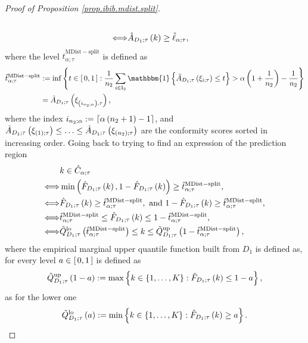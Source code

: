 \documentclass[11pt]{article}
\begin{document}
\begin{proof}[Proof of Proposition \ref{prop.ibib.mdist.split}]
\begin{align*}
    \\
    \Longleftrightarrow
    &
    \hat{A}_{D_1; \tau} \left( k \right)
    \geq \hat{\ell}_{\alpha; \tau},
\end{align*}
where the level $\hat{t}_{\alpha; \tau}^{\mathrm{MDist-split}}$ is defined as
\begin{align}
\label{eq.emp.conf.level}
    \hat{t}_{\alpha; \tau}^{\mathrm{MDist-split}}
    &
    := \inf
    \brac{
        t \in \croch{0, 1} :
        \frac{
            1
        }{n_2}
        \sum_{i \in \mathrm{I_2}}
        \mathbbm{1}
        \brac{
            \hat{A}_{D_1; \tau} \paren{\xi_{i; \tau}}
            \leq t
        } > \alpha \paren{1 + \frac{1}{n_2}} - \frac{1}{n_2}
    }
    \notag
    \\
    &
    =
    \hat{A}_{D_1; \tau} \paren{\xi_{\paren{i_{n_2; \alpha}}, \tau}},
\end{align}
where the index  $i_{n_2; \alpha} := \left\lceil \alpha \left( n_2 + 1 \right) - 1 \right\rceil$,
and $\hat{A}_{D_1; \tau} \left( \xi_{\left( 1 \right); \tau} \right) \leq \ldots \leq \hat{A}_{D_1; \tau} \left( \xi_{\left( n_2 \right); \tau} \right)$
are the conformity scores sorted in increasing order.
%
%
%
Going back to trying to find an expression of the prediction region
\begin{align*}
    &k \in \hat{C}_{\alpha; \tau}
    \\
    \Longleftrightarrow
    &
    \min \left( 
        \hat{F}_{D_1; \tau} \left( k \right),
        1 - \hat{F}_{D_1; \tau} \left( k \right) 
     \right)
    \geq \hat{t}_{\alpha; \tau}^{\mathrm{MDist-split}},
    \\
    \Longleftrightarrow
    &
    \hat{F}_{D_1; \tau} \left( k \right)
    \geq \hat{t}_{\alpha; \tau}^{\mathrm{MDist-split}},
    \mbox{ and }
    1 - \hat{F}_{D_1; \tau} \left( k \right) 
    \geq \hat{t}_{\alpha; \tau}^{\mathrm{MDist-split}},
    \\
    \Longleftrightarrow
    &
    \hat{t}_{\alpha; \tau}^{\mathrm{MDist-split}}
    \leq \hat{F}_{D_1; \tau} \left( k \right)
    \leq 1 - \hat{t}_{\alpha; \tau}^{\mathrm{MDist-split}},
    \\
    \Longleftrightarrow
    &
    \tilde{Q}_{D_1; \tau}^{\mathrm{lo}} \left( \hat{t}_{\alpha; \tau}^{\mathrm{MDist-split}} \right)
    \leq k
    \leq \tilde{Q}_{D_1; \tau}^{\mathrm{up}} \left( 1 - \hat{t}_{\alpha; \tau}^{\mathrm{MDist-split}} \right),
\end{align*}
where the empirical marginal upper quantile function built from $D_1$ is defined as,
for every level $a \in \left[\, 0, 1 \,\right]$ is defined as 
\begin{align}
\label{eq.eqt.up.split}
    \tilde{Q}_{D_1; \tau}^{\mathrm{up}} \left( 1 - a \right)
    := \max \left\{ 
        k \in \left\{ 1, \ldots, K \right\} :
        \hat{F}_{D_1; \tau} \left( k \right) \leq 1 - a
     \right\},
\end{align}
as for the lower one
\begin{align}
\label{eq.eqt.lo.split}
    \tilde{Q}_{D_1; \tau}^{\mathrm{lo}} \left( a \right)
    := \min \left\{ 
        k \in \left\{ 1, \ldots, K \right\} :
        \hat{F}_{D_1; \tau} \left( k \right) \geq a
     \right\}.
\end{align}
\end{proof}
\end{document}
